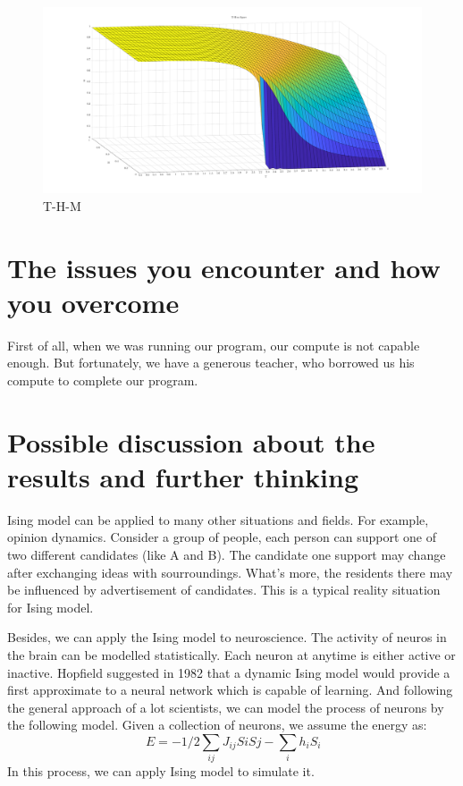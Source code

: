 \documentclass[11pt,openany]{book}              %
\begin{document}
\begin{enumerate}
	\begin{figure}\label{fig:THM}
		\centering
		\includegraphics[width=0.8\linewidth]{THM.pdf}
		\caption{T-H-M}
	\end{figure}
\end{enumerate}
\section{The issues you encounter and how you overcome }
First of all, when we was running our program, our compute is not capable enough. But fortunately, 
we have a generous teacher, who borrowed us his compute to complete our program.

\section{ Possible discussion about the results and further thinking }
Ising model can be applied to many other situations and fields. For example, opinion dynamics.
Consider a group of people, each person can support one of two different candidates (like A and B).
The candidate one support may change after exchanging ideas with sourroundings. 
What's more, the residents there may be influenced by advertisement of candidates. This is a typical
reality situation for Ising model.

Besides, we can apply the Ising model to neuroscience. The activity of neuros in the brain can be 
modelled statistically. Each neuron at anytime is either active or inactive. Hopfield suggested in 1982
that a dynamic Ising model would provide a first approximate to a neural network which is capable of learning.
And following the general approach of a lot scientists, we can model the process of neurons by the following 
model. Given a collection of neurons, we assume the energy as:
\begin{equation}
\, E = -1/2 \sum_{ij}J_{ij}SiSj-\sum_i h_iS_i
\end{equation}
In this process, we can apply Ising model to simulate it. 


%
%
\end{document}
